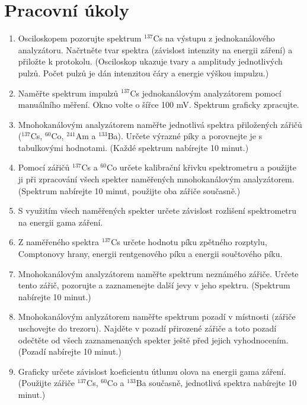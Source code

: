 \documentclass[english]{article}
\begin{document}


\setlength{\parindent}{0.5cm}
\section{Pracovní úkoly}

	\begin{enumerate}
		\item Osciloskopem pozorujte spektrum $^{137}$Cs na výstupu z jednokanálového analyzátoru. Načrtněte tvar spektra (závislost intenzity na energii záření) a přiložte k protokolu. (Osciloskop ukazuje tvary a amplitudy jednotlivých pulzů. Počet pulzů je dán intenzitou čáry a energie výškou impulzu.)
		\item Naměřte spektrum impulzů $^{137}$Cs jednokanálovým analyzátorem pomocí manuálního měření. Okno volte o šířce 100 mV. Spektrum graficky zpracujte. 
		\item Mnohokanálovým analyzátorem naměřte jednotlivá spektra přiložených zářičů ($^{137}$Cs, $^{60}$Co, $^{241}$Am a $^{133}$Ba). Určete výrazné píky a porovnejte je s tabulkovými hodnotami. (Každé spektrum nabírejte 10 minut.)
		\item Pomocí zářičů $^{137}$Cs a $^{60}$Co určete kalibrační křivku spektrometru a použijte ji při zpracování všech spekter naměřených mnohokanálovým analyzátorem. (Spektrum nabírejte 10 minut, použijte oba zářiče současně.)
		\item S využitím všech naměřených spekter určete závislost rozlišení spektrometru na energii gama záření. 
		\item Z naměřeného spektra $^{137}$Cs určete hodnotu píku zpětného rozptylu, Comptonovy hrany, energii rentgenového píku a energii součtového píku.
		\item Mnohokanálovým analyzátorem naměřte spektrum neznámého zářiče. Určete tento zářič, pozorujte a zaznamenejte další jevy v jeho spektru. (Spektrum nabírejte 10 minut.)
		\item Mnohokanálovým anlyzátorem naměřte spektrum pozadí v místnosti (zářiče uschovejte do trezoru). Najděte v pozadí přirozené zářiče a toto pozadí odečtěte od všech zaznamenaných spekter ještě před jejich vyhodnocením. (Pozadí nabírejte 10 minut.)
		\item Graficky určete závislost koeficientu útlumu olova na energii gama záření. (Použijte zářiče $^{137}$Cs, $^{60}$Co a $^{133}$Ba současně, jednotlivá spektra nabírejte 10 minut.)
	\end{enumerate}
\end{document}
